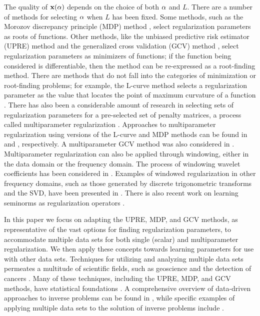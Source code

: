 \documentclass[12pt]{article}
\begin{document}
The quality of $\mathbf{x}(\alpha)$ depends on the choice of both $\alpha$ and $L$. There are a number of methods for selecting $\alpha$ when $L$ has been fixed. Some methods, such as the Morozov discrepancy principle (MDP) method \cite{Morozov1966}, select regularization parameters as roots of functions. Other methods, like the unbiased predictive risk estimator (UPRE) method \cite{Mallows1973} and the generalized cross validation (GCV) method \cite{Wahba1977,Wahba1990}, select regularization parameters as minimizers of functions; if the function being considered is differentiable, then the method can be re-expressed as a root-finding method. There are methods that do not fall into the categories of minimization or root-finding problems; for example, the L-curve method selects a regularization parameter as the value that locates the point of maximum curvature of a function \cite{Hansen1992,HansenOLeary}. There has also been a considerable amount of research in selecting sets of regularization parameters for a pre-selected set of penalty matrices, a process called multiparameter regularization \cite{Brezinski2003,ChungEspanol2017,GazzolaNovati2013,LuPereverzev2011,Wood2002}. Approaches to multiparameter regularization using versions of the L-curve and MDP methods can be found in \cite{BelgeKilmerMiller2002} and \cite{Wang2012}, respectively. A multiparameter GCV method was also considered in \cite{ModarresiGolub1,ModarresiGolub2}. Multiparameter regularization can also be applied through windowing, either in the data domain or the frequency domain. The process of windowing wavelet coefficients has been considered in \cite{EasleyLabatePatel,StephanakisKollias}. Examples of windowed regularization in other frequency domains, such as those generated by discrete trigonometric transforms and the SVD, have been presented in \cite{ChungEasleyOLeary,ChungKilmerOLeary,KalkeSiltanen}. There is also recent work on learning seminorms as regularization operators \cite{Holler2020LearningNR}. \par 
In this paper we focus on adapting the UPRE, MDP, and GCV methods, as representative of the vast options for finding regularization parameters, to accommodate multiple data sets for both single (scalar) and multiparameter regularization. We then apply these concepts towards learning parameters for use with other data sets. Techniques for utilizing and analyzing multiple data sets permeates a multitude of scientific fields, such as geoscience \cite{GeoscienceML,Zobitz2020EfficientHD} and the detection of cancers \cite{MedicineML}. Many of these techniques, including the UPRE, MDP, and GCV methods, have statistical foundations \cite{StatLearning}. A comprehensive overview of data-driven approaches to inverse problems can be found in \cite{Arridge2019SolvingIP}, while specific examples of applying multiple data sets to the solution of inverse problems include \cite{afkham2021learning,ChungChungOLeary2011,ChungEspanol2017,HaberTenorio2003,KunischPock2013,TaroudakiOLeary2015,Learning2005}. \par 
\end{document}
